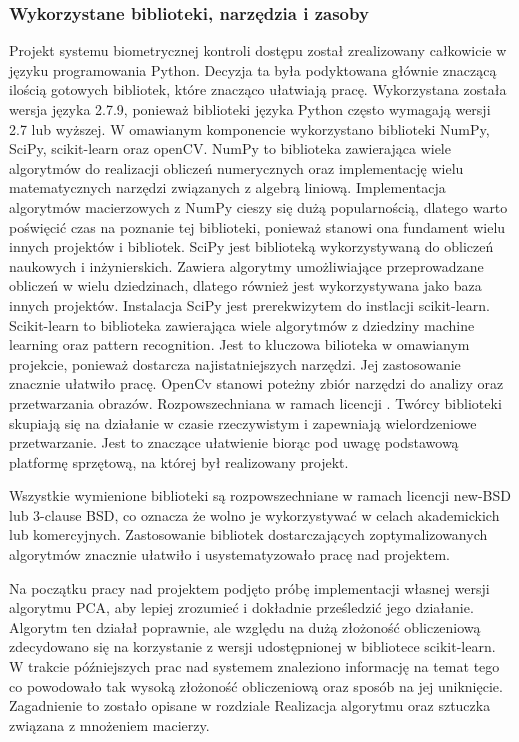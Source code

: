 \documentclass{article}
\begin{document}
\subsubsection{Wykorzystane biblioteki, narzędzia i zasoby}
Projekt systemu biometrycznej kontroli dostępu został zrealizowany całkowicie w języku programowania Python. Decyzja ta była podyktowana głównie znaczącą ilością gotowych bibliotek, które znacząco ułatwiają pracę. Wykorzystana została wersja języka 2.7.9, ponieważ biblioteki języka Python często wymagają wersji 2.7 lub wyższej. W omawianym komponencie wykorzystano biblioteki NumPy, SciPy, scikit-learn oraz openCV. 
NumPy to biblioteka zawierająca wiele algorytmów do realizacji obliczeń numerycznych oraz implementację wielu matematycznych narzędzi związanych z algebrą liniową. Implementacja algorytmów macierzowych z NumPy cieszy się dużą popularnością, dlatego warto poświęcić czas na poznanie tej biblioteki, ponieważ stanowi ona fundament wielu innych projektów i bibliotek.
SciPy jest biblioteką wykorzystywaną do obliczeń naukowych i inżynierskich. Zawiera algorytmy umożliwiające przeprowadzane obliczeń w wielu dziedzinach, dlatego również jest wykorzystywana jako baza innych projektów.
Instalacja SciPy jest prerekwizytem do instlacji scikit-learn. Scikit-learn to biblioteka zawierająca wiele algorytmów z dziedziny machine learning oraz pattern recognition. Jest to kluczowa bilioteka w omawianym projekcie, ponieważ dostarcza najistatniejszych narzędzi. Jej zastosowanie znacznie ułatwiło pracę.
OpenCv stanowi poteżny zbiór narzędzi do analizy oraz przetwarzania obrazów. Rozpowszechniana w ramach licencji . Twórcy biblioteki skupiają się na działanie w czasie rzeczywistym i zapewniają wielordzeniowe przetwarzanie. Jest to znaczące ułatwienie biorąc pod uwagę podstawową platformę sprzętową, na której był realizowany projekt. 

Wszystkie wymienione biblioteki są rozpowszechniane w ramach licencji new-BSD lub 3-clause BSD, co oznacza że wolno je wykorzystywać w celach akademickich lub komercyjnych. Zastosowanie bibliotek dostarczających zoptymalizowanych algorytmów znacznie ułatwiło i usystematyzowało pracę nad projektem.

Na początku pracy nad projektem podjęto próbę implementacji własnej wersji algorytmu PCA, aby lepiej zrozumieć i dokładnie prześledzić jego działanie. Algorytm ten działał poprawnie, ale względu na dużą złożoność obliczeniową zdecydowano się na korzystanie z wersji udostępnionej w bibliotece scikit-learn. W trakcie późniejszych prac nad systemem znaleziono informację na temat tego co powodowało tak wysoką złożoność obliczeniową oraz sposób na jej uniknięcie. Zagadnienie to zostało opisane w rozdziale Realizacja algorytmu oraz sztuczka związana z mnożeniem macierzy.
\end{document}
